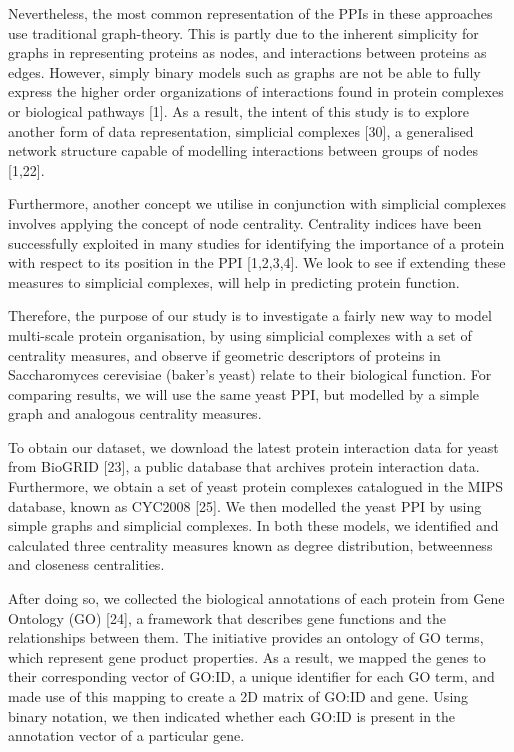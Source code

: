 \documentclass[9pt]{article}
\begin{document}
\par
Nevertheless, the most common representation of the PPIs in these approaches use traditional graph-theory. This is partly due to the inherent simplicity for graphs in representing proteins as nodes, and interactions between proteins as edges. However, simply binary models such as graphs are not be able to fully express the higher order organizations of interactions found in protein complexes or biological pathways [1]. As a result, the intent of this study is to explore another form of data representation, simplicial complexes [30], a generalised network structure capable of modelling interactions between groups of nodes [1,22]. 
\par
Furthermore, another concept we utilise in conjunction with simplicial complexes involves applying the concept of node centrality. Centrality indices have been successfully exploited in many studies for identifying the importance of a protein with respect to its position in the PPI [1,2,3,4]. We look to see if extending these measures to simplicial complexes, will help in predicting protein function.
\par
Therefore, the purpose of our study is to investigate a fairly new way to model multi-scale protein organisation, by using simplicial complexes with a set of centrality measures, and observe if geometric descriptors of proteins in Saccharomyces cerevisiae (baker’s yeast) relate to their biological function. For comparing results, we will use the same yeast PPI, but modelled by a simple graph and analogous centrality measures.
\par
To obtain our dataset, we download the latest protein interaction data for yeast from BioGRID [23], a public database that archives protein interaction data. Furthermore, we obtain a set of yeast protein complexes catalogued in the MIPS database, known as CYC2008 [25]. We then modelled the yeast PPI by using simple graphs and simplicial complexes. In both these models, we identified and calculated three centrality measures known as degree distribution, betweenness and closeness centralities. 
\par
After doing so, we collected the biological annotations of each protein from Gene Ontology (GO) [24], a framework that describes gene functions and the relationships between them. The initiative provides an ontology of GO terms, which represent gene product properties. As a result, we mapped the genes to their corresponding vector of GO:ID, a unique identifier for each GO term, and made use of this mapping to create a 2D matrix of GO:ID and gene. Using binary notation, we then indicated whether each GO:ID is present in the annotation vector of a particular gene.
\end{document}
